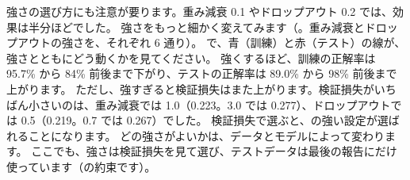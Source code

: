 強さの選び方にも注意が要ります。重み減衰 0.1 やドロップアウト 0.2 では、効果は半分ほどでした。
強さをもっと細かく変えてみます（。重み減衰とドロップアウトの強さを、それぞれ 6 通り）。
で、青（訓練）と赤（テスト）の線が、強さとともにどう動くかを見てください。
強くするほど、訓練の正解率は 95.7\% から 84\% 前後まで下がり、テストの正解率は 89.0\% から 98\% 前後まで上がります。
ただし、強すぎると検証損失はまた上がります。検証損失がいちばん小さいのは、重み減衰では 1.0（0.223。3.0 では 0.277）、ドロップアウトでは 0.5（0.219。0.7 では 0.267）でした。
検証損失で選ぶと、の強い設定が選ばれることになります。
どの強さがよいかは、データとモデルによって変わります。
ここでも、強さは検証損失を見て選び、テストデータは最後の報告にだけ使っています（の約束です）。

